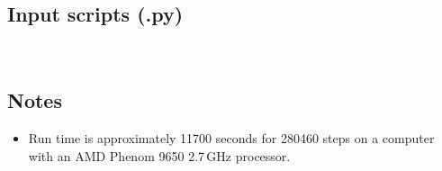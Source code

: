 \subsection{Input scripts (.py)}
\topbar

\bottombar\\
\topbar

\bottombar

\subsection{Notes}
\begin{itemize}
\item Run time is approximately 11700 seconds for 280460 steps on a computer with 
      an AMD Phenom 9650 2.7\,GHz processor.

\end{itemize}
